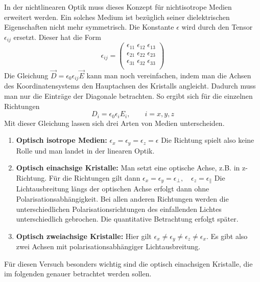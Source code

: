 In der nichtlinearen Optik muss dieses Konzept für nichtisotrope Medien erweitert
werden. Ein solches Medium ist bezüglich seiner dielektrischen Eigenschaften nicht
mehr symmetrisch. Die Konstante $\epsilon$ wird durch den Tensor $\epsilon_{ij}$ 
ersetzt. Dieser hat die Form
\[
    \epsilon_{ij} = 
        \begin{pmatrix}
            \epsilon_{11} \; \epsilon_{12} \; \epsilon_{13} \\
            \epsilon_{21} \; \epsilon_{22} \; \epsilon_{23} \\
            \epsilon_{31} \; \epsilon_{32} \; \epsilon_{33} \\
        \end{pmatrix}
\]
Die Gleichung $\vec{D} = \epsilon_0 \epsilon_{ij} \vec{E}$ kann man noch 
vereinfachen,
indem man die Achsen des Koordinatensystems den Hauptachsen des Kristalls angleicht.
Dadurch muss man nur die Einträge der Diagonale betrachten.
So ergibt sich für die einzelnen Richtungen
\[
    D_i = \epsilon_0 \epsilon_i E_i, \qquad i=x,y,z
\]
Mit dieser Gleichung lassen sich drei Arten von Medien unterscheiden.

\begin{enumerate}
    \item \textbf{Optisch isotrope Medien:} 
          $\epsilon_x = \epsilon_y = \epsilon_z = \epsilon$
          Die Richtung spielt also keine Rolle und man landet in der linearen Optik.

    \item \textbf{Optisch einachsige Kristalle:}
          Man setzt eine optische Achse, z.B. in z-Richtung. Für die Richtungen 
          gilt dann $\epsilon_x = \epsilon_y = \epsilon_{\bot}, \quad 
                     \epsilon_z = \epsilon_{\parallel}$
          Die Lichtausbreitung längs der optischen Achse erfolgt dann ohne
          Polarisationsabhängigkeit. Bei allen anderen Richtungen werden die 
          unterschiedlichen Polarisationsrichtungen des einfallenden Lichtes
          unterschiedlich gebrochen. Die quantitative Betrachtung erfolgt 
          später.
    \item \textbf{Optisch zweiachsige Kristalle:}
          Hier gilt $\epsilon_x \neq \epsilon_y \neq \epsilon_z \neq \epsilon_x$.
          Es gibt also zwei Achsen mit polarisationsabhängiger Lichtausbreitung.
\end{enumerate}
Für diesen Versuch besonders wichtig sind die optisch einachsigen Kristalle, die im
folgenden genauer betrachtet werden sollen.

